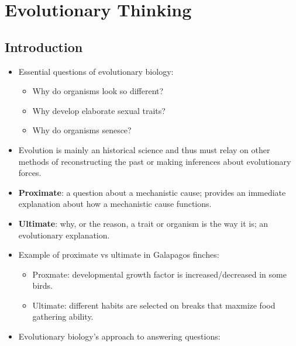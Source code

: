 \documentclass[12pt,a4paper]{article}
\begin{document}
\tableofcontents
\cleardoublepage
\fancyhead{}

\clearpage
{}
\clearpage
\section{Evolutionary Thinking}
\subsection{Introduction}
\begin{itemize}
    \item Essential questions of evolutionary biology: 
        \begin{itemize}
            \item Why do organisms look so different?
            \item Why develop elaborate sexual traits?
            \item Why do organisms senesce?
        \end{itemize}
    \item Evolution is mainly an historical science and thus must relay on other methods of reconstructing the past or making inferences about evolutionary forces. 
    \item \textbf{Proximate}: a question about a mechanistic cause; provides an immediate explanation about {\color{o-Sun}how} a mechanistic cause functions.
    \item \textbf{Ultimate}: {\color{o-Sun}why}, or the reason, a trait or organism is the way it is; an evolutionary explanation.
    \item Example of proximate vs ultimate in Galapagos finches: 
        \begin{itemize}
            \item Proxmate: developmental growth factor is increased/decreased in some birds.
            \item Ultimate: different habits are selected on breaks that maxmize food gathering ability.
        \end{itemize}
    \item Evolutionary biology's approach to answering questions:
        \begin{itemize}

\end{itemize}
\end{itemize}
\end{document}
